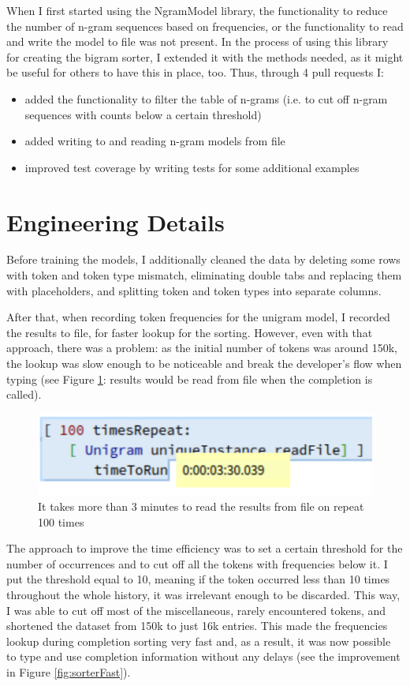 When I first started using the NgramModel library, the functionality to reduce the number of n-gram sequences based on frequencies, or the functionality to read and write the model to file was not present. In the process of using this library for creating the bigram sorter, I extended it with the methods needed, as it might be useful for others to have this in place, too. Thus, through 4 pull requests I:
\begin{itemize}
    \item added the functionality to filter the table of n-grams (i.e. to cut off n-gram sequences with counts below a certain threshold)
    \item added writing to and reading n-gram models from file
    \item improved test coverage by writing tests for some additional examples
\end{itemize}

\section{Engineering Details}
\label{sec:ProposedSolution-Engineering}
Before training the models, I additionally cleaned the data by deleting some rows with token and token type mismatch, eliminating double tabs and replacing them with placeholders, and splitting token and token types into separate columns.

After that, when recording token frequencies for the unigram model, I recorded the results to file, for faster lookup for the sorting. However, even with that approach, there was a problem: as the initial number of tokens was around 150k, the lookup was slow enough to be noticeable and break the developer's flow when typing (see Figure \ref{fig:sorterSlow}: results would be read from file when the completion is called).

\begin{figure}[H]
    \centering
    \includegraphics[width=0.7\linewidth]{images/unigramTimeToRunSlow.png}
    \caption{It takes more than 3 minutes to read the results from file on repeat 100 times}
    \label{fig:sorterSlow}
\end{figure}

The approach to improve the time efficiency was to set a certain threshold for the number of occurrences and to cut off all the tokens with frequencies below it. I put the threshold equal to 10, meaning if the token occurred less than 10 times throughout the whole history, it was irrelevant enough to be discarded. This way, I was able to cut off most of the miscellaneous, rarely encountered tokens, and shortened the dataset from 150k to just 16k entries. This made the frequencies lookup during completion sorting very fast and, as a result, it was now possible to type and use completion information without any delays (see the improvement in Figure \ref{fig:sorterFast}).

